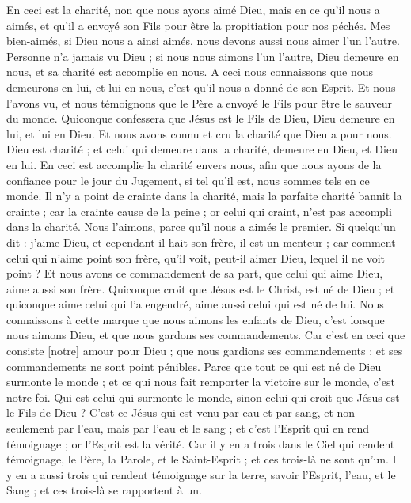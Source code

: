 \begin{multicols}{2}
En ceci est la charité, non que nous ayons aimé Dieu, mais en ce qu'il nous a aimés, et qu'il a envoyé son Fils pour être la propitiation pour nos péchés.
Mes bien-aimés, si Dieu nous a ainsi aimés, nous devons aussi nous aimer l'un l'autre.
Personne n'a jamais vu Dieu ; si nous nous aimons l'un l'autre, Dieu demeure en nous, et sa charité est accomplie en nous.
A ceci nous connaissons que nous demeurons en lui, et lui en nous, c'est qu'il nous a donné de son Esprit.
Et nous l'avons vu, et nous témoignons que le Père a envoyé le Fils pour être le sauveur du monde.
Quiconque confessera que Jésus est le Fils de Dieu, Dieu demeure en lui, et lui en Dieu.
Et nous avons connu et cru la charité que Dieu a pour nous. Dieu est charité ; et celui qui demeure dans la charité, demeure en Dieu, et Dieu en lui.
En ceci est accomplie la charité envers nous, afin que nous ayons de la confiance pour le jour du Jugement, si tel qu'il est, nous sommes tels en ce monde.
Il n'y a point de crainte dans la charité, mais la parfaite charité bannit la crainte ; car la crainte cause de la peine ; or celui qui craint, n'est pas accompli dans la charité.
Nous l'aimons, parce qu'il nous a aimés le premier.
Si quelqu'un dit : j'aime Dieu, et cependant il hait son frère, il est un menteur ; car comment celui qui n'aime point son frère, qu'il voit, peut-il aimer Dieu, lequel il ne voit point ?
Et nous avons ce commandement de sa part, que celui qui aime Dieu, aime aussi son frère.
\VerseOne{}Quiconque croit que Jésus est le Christ, est né de Dieu ; et quiconque aime celui qui l'a engendré, aime aussi celui qui est né de lui.
Nous connaissons à cette marque que nous aimons les enfants de Dieu, c'est lorsque nous aimons Dieu, et que nous gardons ses commandements.
Car c'est en ceci que consiste [notre] amour pour Dieu ; que nous gardions ses commandements ; et ses commandements ne sont point pénibles.
Parce que tout ce qui est né de Dieu surmonte le monde ; et ce qui nous fait remporter la victoire sur le monde, c'est notre foi.
Qui est celui qui surmonte le monde, sinon celui qui croit que Jésus est le Fils de Dieu ?
C'est ce Jésus qui est venu par eau et par sang, et non-seulement par l'eau, mais par l'eau et le sang ; et c'est l'Esprit qui en rend témoignage ; or l'Esprit est la vérité.
Car il y en a trois dans le Ciel qui rendent témoignage, le Père, la Parole, et le Saint-Esprit ; et ces trois-là ne sont qu'un.
Il y en a aussi trois qui rendent témoignage sur la terre, savoir l'Esprit, l'eau, et le Sang ; et ces trois-là se rapportent à un.

\end{multicols}
